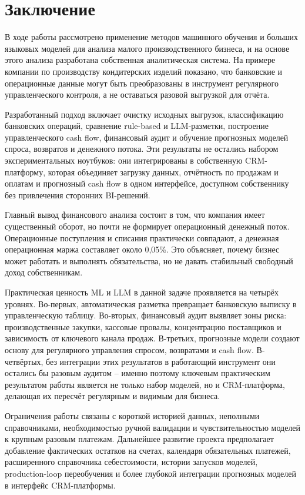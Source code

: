 \chapter*{Заключение}

В ходе работы рассмотрено применение методов машинного обучения и больших языковых моделей для анализа малого производственного бизнеса, и на основе этого анализа разработана собственная аналитическая система. На примере компании по производству кондитерских изделий показано, что банковские и операционные данные могут быть преобразованы в инструмент регулярного управленческого контроля, а не оставаться разовой выгрузкой для отчёта.

Разработанный подход включает очистку исходных выгрузок, классификацию банковских операций, сравнение rule-based и LLM-разметки, построение управленческого cash flow, финансовый аудит и обучение прогнозных моделей спроса, возвратов и денежного потока. Эти результаты не остались набором экспериментальных ноутбуков: они интегрированы в собственную CRM-платформу, которая объединяет загрузку данных, отчётность по продажам и оплатам и прогнозный cash flow в одном интерфейсе, доступном собственнику без привлечения сторонних BI-решений.

Главный вывод финансового анализа состоит в том, что компания имеет существенный оборот, но почти не формирует операционный денежный поток. Операционные поступления и списания практически совпадают, а денежная операционная маржа составляет около 0,05\%. Это объясняет, почему бизнес может работать и выполнять обязательства, но не давать стабильный свободный доход собственникам.

Практическая ценность ML и LLM в данной задаче проявляется на четырёх уровнях. Во-первых, автоматическая разметка превращает банковскую выписку в управленческую таблицу. Во-вторых, финансовый аудит выявляет зоны риска: производственные закупки, кассовые провалы, концентрацию поставщиков и зависимость от ключевого канала продаж. В-третьих, прогнозные модели создают основу для регулярного управления спросом, возвратами и cash flow. В-четвёртых, без интеграции этих результатов в работающий инструмент они остались бы разовым аудитом -- именно поэтому ключевым практическим результатом работы является не только набор моделей, но и CRM-платформа, делающая их пересчёт регулярным и видимым для бизнеса.

Ограничения работы связаны с короткой историей данных, неполными справочниками, необходимостью ручной валидации и чувствительностью моделей к крупным разовым платежам. Дальнейшее развитие проекта предполагает добавление фактических остатков на счетах, календаря обязательных платежей, расширенного справочника себестоимости, истории запусков моделей, production-loop переобучения и более глубокой интеграции прогнозных моделей в интерфейс CRM-платформы.
